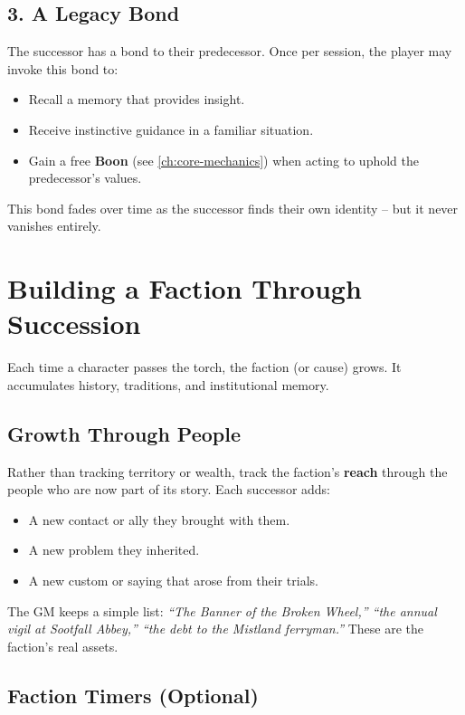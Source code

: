 \subsection{3. A Legacy Bond}
\label{subsec:inherit-bond}

The successor has a bond to their predecessor. Once per session, the player may invoke this bond to:
\begin{itemize}
  \item Recall a memory that provides insight.
  \item Receive instinctive guidance in a familiar situation.
  \item Gain a free \textbf{Boon} (see \ref{ch:core-mechanics}) when acting to uphold the predecessor's values.
\end{itemize}
This bond fades over time as the successor finds their own identity -- but it never vanishes entirely.

\section{Building a Faction Through Succession}
\label{sec:faction-growth}

Each time a character passes the torch, the faction (or cause) grows. It accumulates history, traditions, and institutional memory.

\subsection{Growth Through People}
\label{subsec:faction-people}
Rather than tracking territory or wealth, track the faction's \textbf{reach} through the people who are now part of its story. Each successor adds:
\begin{itemize}
  \item A new contact or ally they brought with them.
  \item A new problem they inherited.
  \item A new custom or saying that arose from their trials.
\end{itemize}
The GM keeps a simple list: \textit{``The Banner of the Broken Wheel,'' ``the annual vigil at Sootfall Abbey,'' ``the debt to the Mistland ferryman.''} These are the faction's real assets.

\subsection{Faction Timers (Optional)}
\label{subsec:faction-timers}

